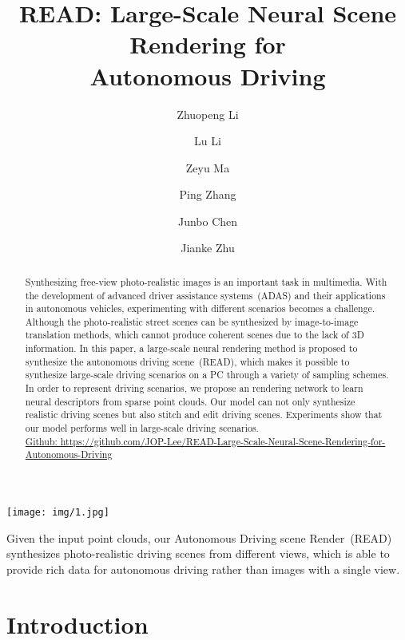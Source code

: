 \documentclass[sigconf]{acmart}
\author{Zhuopeng Li}
\affiliation{\institution{Zhejiang University}
   \country{China}}
\author{Lu Li}
\affiliation{\institution{Zhejiang University}
   \country{China}}
\author{Zeyu Ma}
\affiliation{\institution{Alibaba Group}
   \country{China}}
\author{Ping Zhang}
\affiliation{\institution{Alibaba Group}
   \country{China}}
\author{Junbo Chen}
\affiliation{\institution{Alibaba Group}
   \country{China}}
\author{Jianke Zhu}
\affiliation{\institution{Zhejiang University}
   \country{China}}
\begin{document}
\title{READ: Large-Scale Neural Scene Rendering for \\ Autonomous Driving}







\begin{abstract}
Synthesizing free-view photo-realistic images is an important task in multimedia. With the development of advanced driver assistance systems~(ADAS) and their applications in autonomous vehicles, experimenting with different scenarios becomes a challenge. Although the photo-realistic street scenes can be synthesized by image-to-image translation methods, which cannot produce coherent scenes due to the lack of 3D information. In this paper, a large-scale neural rendering method is proposed to synthesize the autonomous driving scene~(READ), which makes it possible to synthesize large-scale driving scenarios on a PC through a variety of sampling schemes. In order to represent driving scenarios, we propose an  rendering network to learn neural descriptors from sparse point clouds. Our model can not only synthesize realistic driving scenes but also stitch and edit driving scenes. Experiments show that our model performs well in large-scale driving scenarios. \\


\href{https://github.com/JOP-Lee/READ-Large-Scale-Neural-Scene-Rendering-for-Autonomous-Driving}{Github:  https://github.com/JOP-Lee/READ-Large-Scale-Neural-Scene-Rendering-for-Autonomous-Driving}
\end{abstract}








\begin{teaserfigure}
\centering
\texttt{[image: img/1.jpg]}  
  \caption{Given the input point clouds, our Autonomous Driving scene Render~(READ) synthesizes photo-realistic driving scenes from different views, which is able to provide rich data for autonomous driving rather than images with a single view.}
  \label{fig:label1}
\end{teaserfigure}

\maketitle

\section{Introduction}
\end{document}
